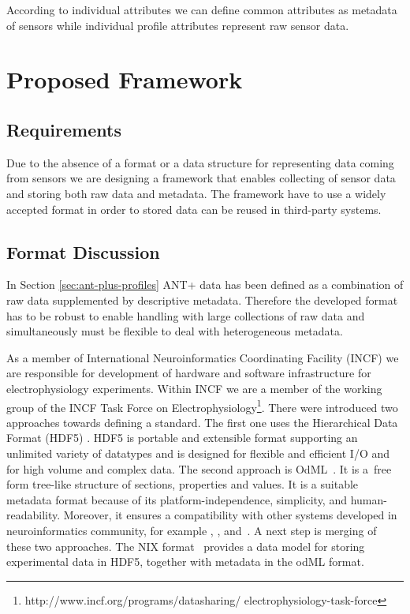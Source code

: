 \documentclass[conference]{IEEEconf}
\begin{document}
According to individual attributes we can define common attributes as metadata of sensors while individual profile attributes represent raw sensor data. 

\section{Proposed Framework}\label{sec:framework}

\subsection{Requirements}\label{sec:requirements}

Due to the absence of a format or a data structure for representing data coming from sensors we are designing a framework that enables collecting of sensor data and storing both raw data and metadata. The framework have to use a widely accepted format in order to stored data can be reused in third-party systems.




\subsection{Format Discussion}

In Section \ref{sec:ant-plus-profiles} ANT+ data has been defined as a combination of raw data supplemented by descriptive metadata. Therefore the developed format has to be robust to enable handling with large collections of raw data and simultaneously must be flexible to deal with heterogeneous metadata.

As a member of International Neuroinformatics Coordinating Facility (INCF) \cite{wvangeit:Bjaalie:JNeurosci:2007} we are responsible for development of hardware and software infrastructure for electrophysiology experiments. Within INCF we are a member of the working group of the INCF Task Force on Electrophysiology\footnote{http://www.incf.org/programs/datasharing/ electrophysiology-task-force}. There were introduced two approaches towards defining a standard. The first one uses the Hierarchical Data Format (HDF5) \cite{hdf5}. HDF5 is portable and extensible format supporting an unlimited variety of datatypes and is designed for flexible and efficient I/O and for high volume and complex data. The second approach is OdML~\cite{10.3389/fninf.2011.00016}. It is a~free form tree-like structure of sections, properties and values. It is a suitable metadata format because of its platform-independence, simplicity, and human-readability. Moreover, it ensures a compatibility with other systems developed in neuroinformatics community, for example \cite{10.3389/conf.fninf.2014.18.00029}, \cite{10.3389/conf.fninf.2014.18.00053}, and~\cite{10.3389/conf.fninf.2013.09.00025}. A next step is merging of these two approaches\cite{10.3389/conf.fninf.2013.09.00069}. The NIX format~\cite{Stoewer:2014} provides a data model for storing experimental data in HDF5, together with metadata in the odML format.
\end{document}
